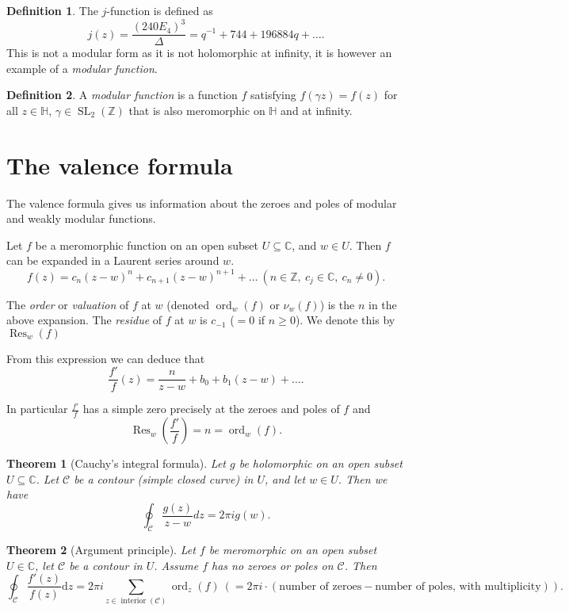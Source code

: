\documentclass{article}
\newtheorem*{thm}{Theorem}
\theoremstyle{definition}
\newtheorem*{defn}{Definition}
\DeclareMathOperator{\SL}{SL}
\DeclareMathOperator{\res}{Res}
\DeclareMathOperator{\ord}{ord}
\begin{document}
\begin{defn}
The $j$-function is defined as
\[j(z) = \frac{(240E_4)^3}{\Delta} = q^{-1} + 744 +196884q + \ldots.\]
This is not a modular form as it is not holomorphic at infinity, it is however an example of a \emph{modular function}.
\end{defn}

\begin{defn}
A \emph{modular function} is a function $f$ satisfying $f(\gamma z) = f(z)$ for all $z\in\mathbb{H}$, $\gamma\in\SL_2(\mathbb{Z})$ that is also meromorphic on $\mathbb{H}$ and at infinity.
\end{defn}

\section{The valence formula}

The valence formula gives us information about the zeroes and poles of modular and weakly modular functions.

Let $f$ be a meromorphic function on an open subset $U\subseteq\mathbb{C}$, and $w\in U$.
Then $f$ can be expanded in a Laurent series around $w$.
\[f(z) = c_n(z-w)^n + c_{n+1}(z-w)^{n+1} + \ldots\ (n\in\mathbb{Z},\ c_j\in\mathbb{C},\ c_n\ne 0).\]

The \emph{order} or \emph{valuation} of $f$ at $w$ (denoted $\ord_w(f)$ or $\nu_w(f)$) is the $n$ in the above expansion.
The \emph{residue} of $f$ at $w$ is $c_{-1}$ ($ = 0$ if $n\ge 0$).
We denote this by $\res_w(f)$

From this expression we can deduce that
\[\frac{f'}{f}(z) = \frac{n}{z-w} + b_0 + b_1(z-w) + \ldots.\]

In particular $\frac{f'}{f}$ has a simple zero precisely at the zeroes and poles of $f$ and
\[\res_w\left(\frac{f'}{f}\right) = n = \ord_w(f).\]

\begin{thm}[Cauchy's integral formula] Let $g$ be holomorphic on an open subset $U\subseteq\mathbb{C}$.
Let $\mathcal{C}$ be a contour (simple closed curve) in $U$, and let $w\in U$.
Then we have
\[\oint_{\mathcal{C}} \frac{g(z)}{z-w}dz = 2\pi i g(w).\]
\end{thm}

\begin{thm}[Argument principle] Let $f$ be meromorphic on an open subset $U\in\mathbb{C}$, let $\mathcal{C}$ be a contour in $U$.
Assume $f$ has no zeroes or poles on $\mathcal{C}$.
Then
\[\oint_{\mathcal{C}} \frac{f'(z)}{f(z)} \mathrm{d}z = 2\pi i \sum_{z\in\operatorname{interior}(\mathcal{C})} \ord_z(f)\ (=2\pi i \cdot(\textrm{number of zeroes} - \textrm{number of poles, with multiplicity})).\]
\end{thm}
\end{document}
